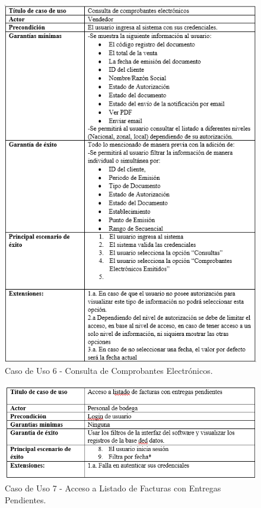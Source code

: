 \documentclass{scrreprt}
\begin{document}
\begin{figure}[!htpb]
    \centerline{\includegraphics[scale=.75]{images/case_stiff/stuff6.png}}
    \caption{Caso de Uso 6 - Consulta de Comprobantes Electrónicos.}
    \label{fig}
\end{figure}
\FloatBarrier

\begin{figure}[!htpb]
    \centerline{\includegraphics[scale=.75]{images/case_stiff/stuff7.png}}
    \caption{Caso de Uso 7 - Acceso a Listado de Facturas con Entregas Pendientes.}
    \label{fig}
\end{figure}
\FloatBarrier
\end{document}
